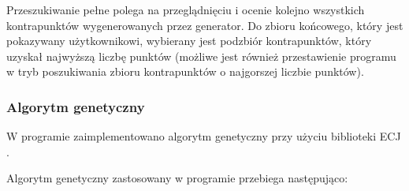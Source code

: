 \documentclass{article}
\begin{document}
Przeszukiwanie pełne polega na przeglądnięciu i ocenie kolejno wszystkich kontrapunktów wygenerowanych przez generator. Do zbioru końcowego, który jest pokazywany użytkownikowi, wybierany jest podzbiór kontrapunktów, który uzyskał najwyższą liczbę punktów (możliwe jest również przestawienie programu w tryb poszukiwania zbioru kontrapunktów o najgorszej liczbie punktów).

\subsubsection{Algorytm genetyczny}

W programie zaimplementowano algorytm genetyczny przy użyciu biblioteki ECJ \cite{ecjManual, ecjTutorials}.

Algorytm genetyczny zastosowany w programie przebiega następująco:
\end{document}
